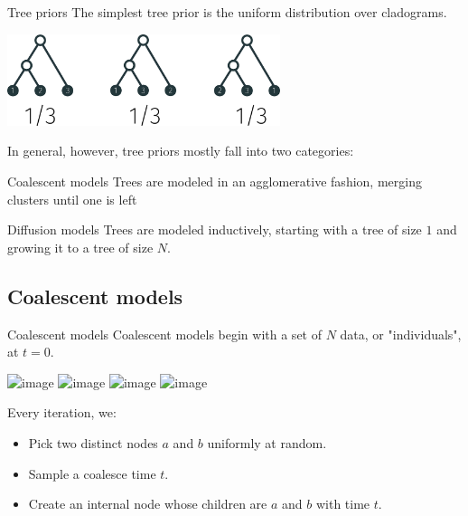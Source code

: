 \documentclass[10pt, compress]{beamer}
\begin{document}
\begin{frame}{Tree priors}
  The simplest tree prior is the uniform distribution over
  cladograms.

  \pause

  \begin{center}
    \includegraphics[width=0.6\textwidth]{img/uniform-distribution}
  \end{center}

  \pause
  In general, however, tree priors mostly fall into two categories:
  \begin{block}{Coalescent models}
    Trees are modeled in an
      agglomerative fashion, merging clusters until 
      one is left
    \end{block}
  \begin{block}{Diffusion models}
    Trees are modeled inductively,
      starting with a tree of size $1$ and growing it to
      a tree of size $N$.
    \end{block}
\end{frame}

\subsection{Coalescent models}

\begin{frame}{Coalescent models}
  Coalescent models begin with a set of $N$
  data, or "individuals", at $t = 0$.

  \begin{center}
    \includegraphics<1>[width=0.5\textwidth]{img/coalescent-1}
    \includegraphics<2>[width=0.5\textwidth]{img/coalescent-2}
    \includegraphics<3>[width=0.5\textwidth]{img/coalescent-3}
    \includegraphics<4>[width=0.5\textwidth]{img/coalescent-4}
  \end{center}

  \pause

  Every iteration, we:
  \begin{itemize}
    \item Pick two distinct nodes $a$ and $b$ uniformly at random.
    \item Sample a coalesce time $t$.
    \item Create an internal node whose children are $a$ and $b$
      with time $t$.
  \end{itemize}
\end{frame}
\end{document}
